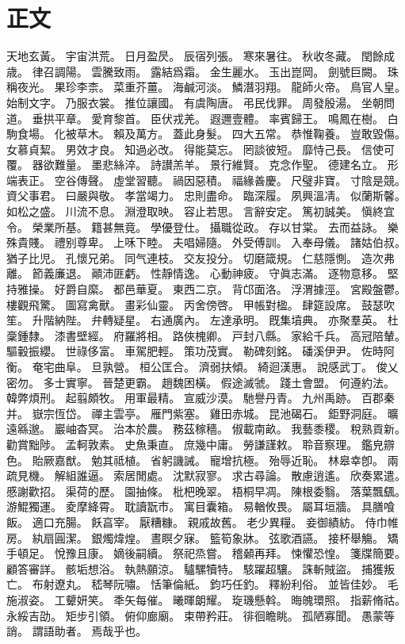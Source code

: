 \chapter{正文}%
\watermarkoff%
\thispagestyle{mychapter}%
\pagestyle{mytext}%
\ugenkomin

天地玄黃。%
宇宙洪荒。%
日月盈昃。%
辰宿列張。%
寒來暑往。%
秋收冬藏。%
閏餘成歳。%
律召調陽。%
雲騰致雨。%
露結爲霜。%
金生麗水。%
玉出崑岡。%
劍號巨闕。%
珠稱夜光。%
果珍李柰。%
菜重芥薑。%
海鹹河淡。%
鱗潛羽翔。%
龍師火帝。%
鳥官人皇。%
始制文字。%
乃服衣裳。%
推位讓國。%
有虞陶唐。%
弔民伐罪。%
周發殷湯。%
坐朝問道。%
垂拱平章。%
愛育黎首。%
臣伏戎羌。%
遐邇壹體。%
率賓歸王。%
鳴鳳在樹。%
白駒食場。%
化被草木。%
賴及萬方。%
蓋此身髮。%
四大五常。%
恭惟鞠養。%
豈敢毀傷。%
女慕貞絜。%
男效才良。%
知過必改。%
得能莫忘。%
罔談彼短。%
靡恃己長。%
信使可覆。%
器欲難量。%
墨悲絲淬。%
詩讃羔羊。%
景行維賢。%
克念作聖。%
德建名立。%
形端表正。%
空谷傳聲。%
虛堂習聽。%
禍因惡積。%
福緣善慶。%
尺璧非寶。%
寸陰是競。%
資父事君。%
曰嚴與敬。%
孝當竭力。%
忠則盡命。%
臨深履{}。%
夙興溫凊。%
似蘭斯馨。%
如松之盛。%
川流不息。%
淵澄取映。%
容止若思。%
言辭安定。%
篤初誠美。%
愼終宜令。%
榮業所基。%
籍甚無竟。%
學優登仕。%
攝職從政。%
存以甘棠。%
去而益詠。%
樂殊貴賤。%
禮别尊卑。%
上咊下睦。%
夫唱婦隨。%
外受傅訓。%
入奉母儀。%
諸姑伯叔。%
猶子比児。%
孔懷兄弟。%
同气連枝。%
交友投分。%
切磨箴規。%
仁慈隱惻。%
造次弗離。%
節義廉退。%
顚沛匪虧。%
性靜情逸。%
心動神疲。%
守眞志滿。%
逐物意移。%
堅持雅操。%
好爵自縻。%
都邑華夏。%
東西二京。%
背邙面洛。%
浮渭據涇。%
宮殿盤鬱。%
樓觀飛驚。%
圖寫禽獸。%
畫彩仙靈。%
丙舍傍啓。%
甲帳對楹。%
肆筵設席。%
鼓瑟吹笙。%
升階納陛。%
弁轉疑星。%
右通廣內。%
左達承明。%
既集墳典。%
亦聚羣英。%
杜稾鍾隸。%
漆書壁經。%
府羅將相。%
路俠槐卿。%
戸封八縣。%
家給千兵。%
高冠陪輦。%
驅轂振纓。%
世祿侈富。%
車駕肥輕。%
策功茂實。%
勒碑刻銘。%
磻溪伊尹。%
佐時阿衡。%
奄宅曲阜。%
{}旦孰營。%
桓公匡合。%
濟弱扶傾。%
綺迴漢惠。%
說感武丁。%
俊乂密勿。%
多士實寧。%
晉楚更霸。%
趙魏困橫。%
假途滅虢。%
踐土會盟。%
何遵約法。%
韓弊煩刑。%
起翦頗牧。%
用軍最精。%
宣威沙漠。%
馳譽丹青。%
九州禹跡。%
百郡秦并。%
嶽宗恆岱。%
禪主雲亭。%
雁門紫塞。%
雞田赤城。%
昆池碣石。%
鉅野洞庭。%
曠遠緜邈。%
巖岫杳冥。%
治本於農。%
務茲稼穡。%
俶載南畝。%
我藝黍稷。%
稅熟貢新。%
勸賞黜陟。%
孟軻敦素。%
史魚秉直。%
庶幾中庸。%
勞謙謹敕。%
聆音察理。%
鑑皃辧色。%
貽厥嘉猷。%
勉其祗植。%
省躬譏誡。%
寵增抗極。%
殆辱近恥。%
林皋幸卽。%
兩疏見機。%
解組誰逼。%
索居閒處。%
沈默寂寥。%
求古尋論。%
散慮逍遙。%
欣奏累遣。%
慼謝歡招。%
渠荷的歷。%
園{}抽條。%
枇杷晚翠。%
梧桐早凋。%
陳根委翳。%
落葉飄颻。%
游鯤獨運。%
夌摩絳霄。%
耽讀翫市。%
寓目囊箱。%
易輶攸畏。%
屬耳垣牆。%
具膳喰飯。%
適口充腸。%
{}飫亯宰。%
{}厭糟糠。%
親戚故舊。%
老少異糧。%
妾御績紡。%
侍巾帷房。%
紈扇圓潔。%
銀燭煒煌。%
晝瞑夕寐。%
籃筍象牀。%
弦歌酒讌。%
接杯舉觴。%
矯手頓足。%
悅豫且康。%
嫡後嗣續。%
祭祀烝嘗。%
稽顙再拜。%
悚懼恐惶。%
箋牒簡要。%
顧答審詳。%
骸垢想浴。%
執熱願涼。%
驢騾犢特。%
駭躍超驤。%
誅斬賊盜。%
捕獲叛亡。%
布射遼丸。%
嵇琴阮嘯。%
恬筆倫紙。%
鈞巧任釣。%
釋紛利俗。%
並皆佳妙。%
毛施淑姿。%
工顰妍笑。%
秊矢每催。%
曦暉朗耀。%
琁璣懸斡。%
晦魄環照。%
指薪脩祜。%
永綏吉劭。%
矩步引領。%
俯仰廊廟。%
束帶矜莊。%
徘徊瞻眺。%
孤陋寡聞。%
愚蒙等誚。%
謂語助者。%
焉哉乎也。%
%
%
%
%
